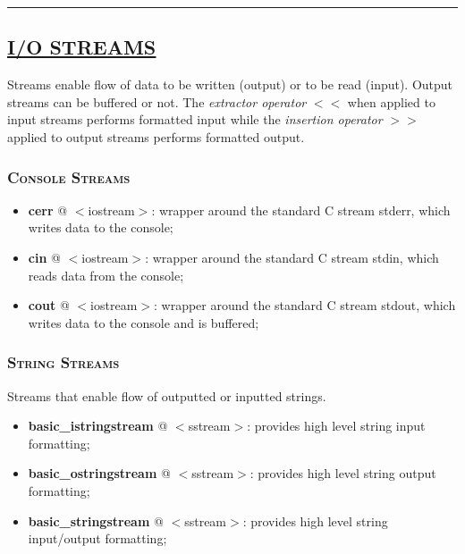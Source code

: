 \documentclass[10pt]{article}
\begin{document}
\begin{multicols*}{5}
{}



\par\noindent\rule{155pt}{0.4pt}

{\color{Blue}
\subsection*{\href{https://en.cppreference.com/w/cpp/io}{\underline{I/O STREAMS}}}	
\noindent
Streams enable flow of data to be written (output) or to be read (input). Output streams can be buffered or not.
The \emph{extractor operator} $<<$ when applied to input streams performs formatted input while the \emph{insertion operator} $>>$ applied to output streams performs formatted output. 

\subsubsection*{\textsc{Console Streams}} 
\begin{itemize}[leftmargin=*,topsep=0.25pt]
  \setlength\itemsep{-1.8pt}
	\item \textbf{cerr} @ $<$iostream$>$: wrapper around the standard C stream stderr, which writes data to the console;
	\item \textbf{cin} @ $<$iostream$>$: wrapper around the standard C stream stdin, which reads data from the console;
	\item \textbf{cout} @ $<$iostream$>$: wrapper around the standard C stream stdout, which writes data to the console and is buffered;
\end{itemize}

\subsubsection*{\textsc{String Streams}}
\noindent
Streams that enable flow of outputted or inputted strings.

\begin{itemize}[leftmargin=*,topsep=0.25pt]
  \setlength\itemsep{-1.8pt}
	\item \textbf{basic\_istringstream} @ $<$sstream$>$: provides high level string input formatting;
	\item \textbf{basic\_ostringstream} @ $<$sstream$>$: provides high level string output formatting;
	\item \textbf{basic\_stringstream} @ $<$sstream$>$: provides high level string input/output formatting;
\end{itemize}


}
\end{multicols*}
\end{document}

